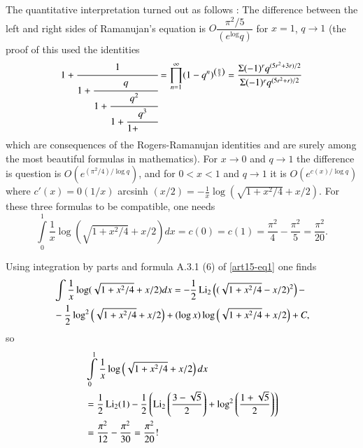 The quantitative interpretation turned out as follows \cite{art15-key9} : The difference between the left and right sides of Ramanujan's equation is $O\dfrac{\pi^{2}/5}{(e^{\log}q)}$ for $x=1$, $q\to 1$ (the proof of this used the identities
$$
1+\cfrac{1}{1+\cfrac{q}{1+\cfrac{q^{2}}{1+\cfrac{q^{3}}{1+\qquad }{}}}}=\prod\limits^{\infty}_{n=1}(1-q^{n})^{\left(\frac{n}{5}\right)}=\dfrac{\Sigma(-1)^{r}q^{(5r^{2}+3r)/2}}{\Sigma(-1)^{r}q^{(5r^{2}+r)/2}}
$$
which are consequences of the Rogers-Ramanujan identities and are surely among the most beautiful formulas in mathematics). For $x\to 0$ and $q\to 1$ the difference is question is $O(e^{(\pi^{2}/4)/\log q})$, and for $0<x<1$ and $q\to 1$ it is $O(e^{c(x)/\log q})$ where $c'(x)=0(1/x)$ arcsinh $(x/2)=-\frac{1}{x}\log (\sqrt{1+x^{2}/4}+x/2)$. For these three formulas to be compatible, one needs
$$
\int\limits^{1}_{0}\frac{1}{x}\log(\sqrt{1+x^{2}/4}+x/2)dx=c(0)=c(1)=\dfrac{\pi^{2}}{4}-\dfrac{\pi^{2}}{5}=\dfrac{\pi^{2}}{20}.
$$

Using integration by parts and formula A.3.1 (6) of \eqref{art15-eq1} one finds
\begin{align*}
& \int\frac{1}{x}\log (\sqrt{1+x^{2}/4}+x/2)dx=-\dfrac{1}{2}\operatorname{Li}_{2}\left((\sqrt{1+x^{2}/4}-x/2)^{2}\right)-\\
& -\frac{1}{2}\log^{2}\left(\sqrt{1+x^{2}/4}+x/2\right)+(\log x)\log\left(\sqrt{1+x^{2}/4}+x/2\right)+C,
\end{align*}\pageoriginale
so
\begin{align*}
& \int\limits^{1}_{0}\frac{1}{x}\log \left(\sqrt{1+x^{2}/4}+x/2\right)dx\\
&=\frac{1}{2}\operatorname{Li}_{2}(1)-\frac{1}{2}\left(\operatorname{Li}_{2}\left(\frac{3-\sqrt{5}}{2}\right)+\log^{2}\left(\frac{1+\sqrt{5}}{2}\right)\right)\\
&=\frac{\pi^{2}}{12}-\frac{\pi^{2}}{30}=\frac{\pi^{2}}{20}!
\end{align*}

